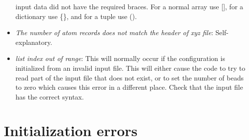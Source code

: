 \documentclass[11pt,english,fleqn]{report}
\begin{document}
\begin{itemize}
input data did not have the required braces. For a normal array use
{[}{]}, for a dictionary use \{\}, and for a tuple use ().
\item \emph{The number of atom records does not match the header of xyz file}:
Self-explanatory.
\item \emph{list index out of range}: This will normally occur if the configuration
is initialized from an invalid input file. This will either cause
the code to try to read part of the input file that does not exist,
or to set the number of beads to zero which causes this error in a
different place. Check that the input file has the correct syntax.
\end{itemize}

\section{Initialization errors}
\end{document}
